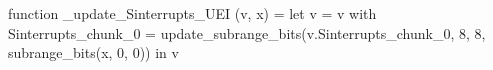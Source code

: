 function _update_Sinterrupts_UEI (v, x) = let v = { v with Sinterrupts_chunk_0 = update_subrange_bits(v.Sinterrupts_chunk_0, 8, 8, subrange_bits(x, 0, 0)) } in
  v
